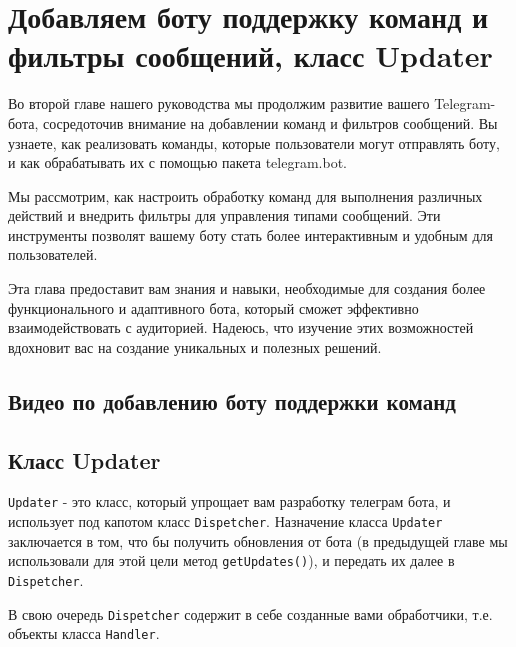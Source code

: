 \documentclass[
]{book}
\begin{document}
\chapter{Добавляем боту поддержку команд и фильтры сообщений, класс Updater}\label{ux434ux43eux431ux430ux432ux43bux44fux435ux43c-ux431ux43eux442ux443-ux43fux43eux434ux434ux435ux440ux436ux43aux443-ux43aux43eux43cux430ux43dux434-ux438-ux444ux438ux43bux44cux442ux440ux44b-ux441ux43eux43eux431ux449ux435ux43dux438ux439-ux43aux43bux430ux441ux441-updater}

Во второй главе нашего руководства мы продолжим развитие вашего Telegram-бота, сосредоточив внимание на добавлении команд и фильтров сообщений. Вы узнаете, как реализовать команды, которые пользователи могут отправлять боту, и как обрабатывать их с помощью пакета telegram.bot.

Мы рассмотрим, как настроить обработку команд для выполнения различных действий и внедрить фильтры для управления типами сообщений. Эти инструменты позволят вашему боту стать более интерактивным и удобным для пользователей.

Эта глава предоставит вам знания и навыки, необходимые для создания более функционального и адаптивного бота, который сможет эффективно взаимодействовать с аудиторией. Надеюсь, что изучение этих возможностей вдохновит вас на создание уникальных и полезных решений.

\section{Видео по добавлению боту поддержки команд}\label{ux432ux438ux434ux435ux43e-ux43fux43e-ux434ux43eux431ux430ux432ux43bux435ux43dux438ux44e-ux431ux43eux442ux443-ux43fux43eux434ux434ux435ux440ux436ux43aux438-ux43aux43eux43cux430ux43dux434}

\section{Класс Updater}\label{ux43aux43bux430ux441ux441-updater}

\texttt{Updater} - это класс, который упрощает вам разработку телеграм бота, и использует под капотом класс \texttt{Dispetcher}. Назначение класса \texttt{Updater} заключается в том, что бы получить обновления от бота (в предыдущей главе мы использовали для этой цели метод \texttt{getUpdates()}), и передать их далее в \texttt{Dispetcher}.

В свою очередь \texttt{Dispetcher} содержит в себе созданные вами обработчики, т.е. объекты класса \texttt{Handler}.
\end{document}
